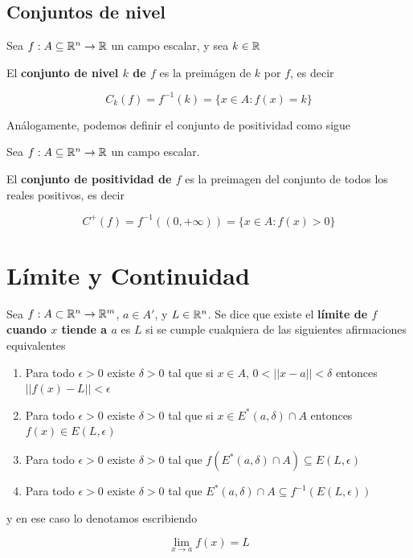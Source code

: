 \section{Conjuntos de nivel}

\begin{definition}
Sea $f : A \subseteq \mathbb{R}^n \to \mathbb{R}$ un campo escalar, y sea $k \in \mathbb{R}$

El \textbf{conjunto de nivel $k$ de $f$}  es la preimágen de $k$ por $f$, es decir 

$$ C_k(f) = f^{-1}(k) = \{x \in A : f(x) = k \} $$
\end{definition}

Análogamente, podemos definir el conjunto de positividad como sigue

\begin{definition}[Positividad]
Sea $f : A \subseteq \mathbb{R}^n \to \mathbb{R}$ un campo escalar.

El \textbf{conjunto de positividad de $f$} es la preimagen del conjunto de todos los reales positivos, es decir

$$ C^+(f) = f^{-1}((0,+\infty)) = \{x \in A : f(x) > 0 \} $$
\end{definition}



\chapter{Límite y Continuidad}

\begin{definition}[Límite]
Sea $f : A \subset \mathbb{R}^n \to \mathbb{R}^m$, $ a \in A'$, y $L \in \mathbb{R}^n$.  Se dice que existe el \textbf{límite de $f$ cuando $x$ tiende a $a$}  es $L$ si se cumple cualquiera de las siguientes afirmaciones equivalentes

\begin{enumerate} 

\item Para todo $\epsilon > 0$ existe $\delta > 0$ tal que si $x \in A$, $0 < ||x-a|| < \delta$ entonces $||f(x) - L|| < \epsilon$

\item Para todo $\epsilon > 0$ existe $\delta > 0$ tal que si $x \in E^*(a,\delta) \cap A$ entonces $f(x) \in E(L,\epsilon)$

\item Para todo $\epsilon > 0$ existe $\delta > 0$ tal que $f(E^*(a,\delta) \cap A) \subseteq E(L,\epsilon)$

\item Para todo $\epsilon > 0$ existe $\delta > 0$ tal que $E^*(a,\delta) \cap A \subseteq f^{-1}(E(L,\epsilon))$

\end{enumerate}

y en ese caso lo denotamos escribiendo

$$ \displaystyle \lim_{x \to a} f(x) = L $$

\end{definition}


